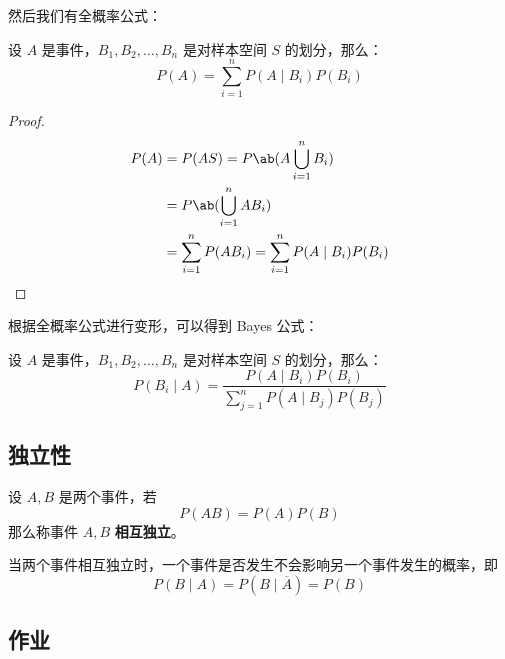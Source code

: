 然后我们有全概率公式：

\begin{theorem}[全概率公式]
    设 $A$ 是事件，$B_1, B_2,\dots, B_n$ 是对样本空间 $S$ 的划分，那么：
    $$
    P(A) = \sum_{i = 1}^{n} P(A \mid B_i) P(B_i)
    $$
    \begin{proof}
        $$
        \begin{aligned}
            P(A) & = P(A S) = P\ab(A \bigcup_{i = 1}^{n} B_i) \\
            & = P\ab(\bigcup_{i = 1}^{n} A B_i) \\
            & = \sum_{i = 1}^{n} P(A B_i) = \sum_{i = 1}^{n} P(A \mid B_i) P(B_i)
        \end{aligned}
        $$
    \end{proof}
\end{theorem}

根据全概率公式进行变形，可以得到 Bayes 公式：

\begin{theorem}
    设 $A$ 是事件，$B_1, B_2,\dots, B_n$ 是对样本空间 $S$ 的划分，那么：
    $$
    P(B_i \mid A) = \frac{P(A \mid B_i) P(B_i)}{\sum_{j = 1}^{n} P(A \mid B_j) P(B_j)}
    $$
\end{theorem}

\subsection{独立性}

\begin{theorem}[独立性]
    设 $A, B$ 是两个事件，若
    $$
    P(A B) = P(A) P(B)
    $$
    那么称事件 $A, B$ \textbf{相互独立}。
\end{theorem}

当两个事件相互独立时，一个事件是否发生不会影响另一个事件发生的概率，即
$$
P(B \mid A) = P(B \mid \overline{A}) = P(B)
$$

\subsection{作业}

